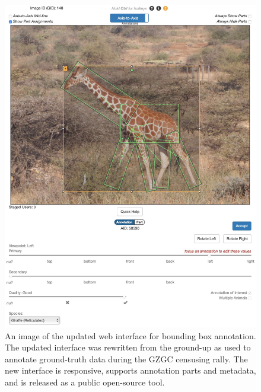 \begin{figure}[!t]
    \begin{center}
        \includegraphics[width=0.85\linewidth]{resources/interface-detection.pdf}
    \end{center}
    \caption{An image of the updated web interface for bounding box annotation.  The updated interface was rewritten from the ground-up as used to annotate ground-truth data during the GZGC censusing rally.  The new interface is responsive, supports annotation parts and metadata, and is released as a public open-source tool.}
    \label{fig:interface-detection}
\end{figure}

